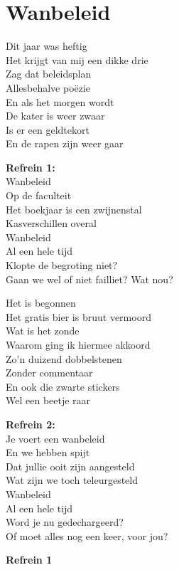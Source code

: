 \section{Wanbeleid}
Dit jaar was heftig\\
Het krijgt van mij een dikke drie\\
Zag dat beleidsplan\\
Allesbehalve poëzie\\
En als het morgen wordt\\
De kater is weer zwaar\\
Is er een geldtekort\\
En de rapen zijn weer gaar

\textbf{Refrein 1:}\\
Wanbeleid\\
Op de faculteit\\
Het boekjaar is een zwijnenstal\\
Kasverschillen overal\\
Wanbeleid\\
Al een hele tijd\\
Klopte de begroting niet?\\
Gaan we wel of niet failliet? Wat nou?

Het is begonnen\\
Het gratis bier is bruut vermoord\\
Wat is het zonde\\
Waarom ging ik hiermee akkoord\\
Zo'n duizend dobbelstenen\\
Zonder commentaar\\
En ook die zwarte stickers\\
Wel een beetje raar

\textbf{Refrein 2:}\\
Je voert een wanbeleid\\
En we hebben spijt\\
Dat jullie ooit zijn aangesteld\\
Wat zijn we toch teleurgesteld\\
Wanbeleid\\
Al een hele tijd\\
Word je nu gedechargeerd?\\
Of moet alles nog een keer, voor jou?

\textbf{Refrein 1}
